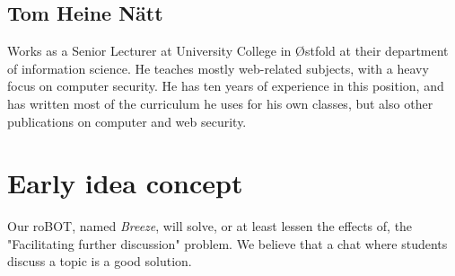 \documentclass{article}
\begin{document}
\subsection{Tom Heine Nätt} 
Works as a Senior Lecturer at University College in Østfold at their department of information science. He teaches mostly web-related subjects, with a heavy focus on computer security. He has ten years of experience in this position, and has written most of the curriculum he uses for his own classes, but also other publications on computer and web security.

\section{Early idea concept}
Our roBOT, named \textit{Breeze}, will solve, or at least lessen the effects of, the "Facilitating further discussion" problem. We believe that a chat where students discuss a topic is a good solution.


\end{document}
